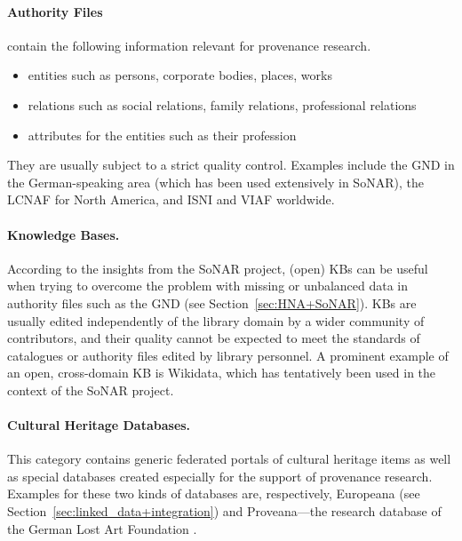 \paragraph{Authority Files}
%
contain the following information relevant for provenance research.
%
\begin{itemize}
  \item
    entities such as persons, corporate bodies, places, works
  \item
    relations such as social relations, family relations, professional relations
  \item
    attributes for the entities such as their profession
\end{itemize}
%
They are usually subject to a strict quality control.
Examples include the \gls{GND} in the German-speaking area (which has been used extensively in \gls{SoNAR}),
the \gls{LCNAF} for North America,
and \gls{ISNI} and \gls{VIAF} worldwide.

\paragraph{Knowledge Bases.}

According to the insights from the \gls{SoNAR} project,
(open) \glspl{KB} can be useful when trying to overcome the problem with missing or unbalanced data
in authority files such as the \gls{GND} (see Section~\ref{sec:HNA+SoNAR}).
\Glspl{KB} are usually edited independently of the library domain by a wider community of contributors,
and their quality cannot be expected to meet the standards of catalogues or authority files edited by library personnel.
A prominent example of an open, cross-domain \gls{KB} is Wikidata,
which has tentatively been used in the context of the \gls{SoNAR} project.

\paragraph{Cultural Heritage Databases.}

This category contains generic federated portals of cultural heritage items
as well as special databases created especially for the support of provenance research.
Examples for these two kinds of databases are, respectively, Europeana (see Section~\ref{sec:linked_data+integration})
and Proveana---the research database of the German Lost Art Foundation \autocite{Proveana}.

